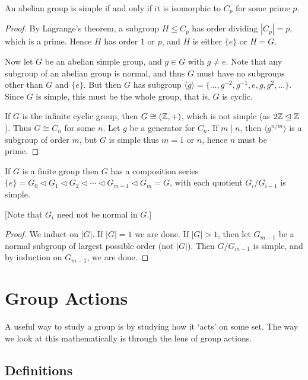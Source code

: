 \documentclass[a4paper]{scrartcl}
\begin{document}
\begin{lemma}
	An abelian group is simple if and only if it is isomorphic to $C_p$ for some prime $p$.
\end{lemma}
\begin{proof}
	By Lagrange's theorem, a subgroup $H \leq C_p$ has order dividing $|C_p| = p$, which is a prime. Hence $H$ has order 1 or $p$, and $H$ is either $\{e\}$ or $H = G$.

	Now let $G$ be an abelian simple group, and $g \in G$ with $g \neq e$. Note that any subgroup of an abelian group is normal, and thus $G$ must have no subgroups other than $G$ and $\{e\}$. But then $G$ has subgroup $\langle g \rangle = \{\dots, g^{-2}, g^{-1}, e, g, g^2, \dots \}$. Since $G$ is simple, this must be the whole group, that is, $G$ is cyclic.

	If $G$ is the infinite cyclic group, then $G \cong (\mathbb{Z}, +)$, which is not simple (as $2 \mathbb{Z} \trianglelefteq \mathbb{Z}$). Thus $G \cong C_n$ for some $n$. Let $g$ be a generator for $C_n$. If $m \mid n$, then $\langle g^{n/m} \rangle$ is a subgroup of order $m$, but $G$ is simple thus $m = 1$ or $n$, hence $n$ must be prime.
\end{proof}

\begin{lemma}
	If $G$ is a finite group then $G$ has a composition series $\{e\} = G_0 \triangleleft G_1 \triangleleft G_2 \triangleleft \cdots \triangleleft G_{m- 1} \triangleleft G_m = G$, with each quotient $G_i / G_{i - 1}$ is simple.

	[Note that $G_i$ need not be normal in $G$.]
\end{lemma}
\begin{proof}
	We induct on $|G|$. If $|G| = 1$ we are done. If $|G| > 1$, then let $G_{m - 1}$ be a normal subgroup of largest possible order (not $|G|$). Then $G/G_{m - 1}$ is simple, and by induction on $G_{m - 1}$, we are done.
\end{proof}


\section{Group Actions}

A useful way to study a group is by studying how it `acts' on some set.
The way we look at this mathematically is through the lens of group actions.

\subsection{Definitions}
\end{document}
